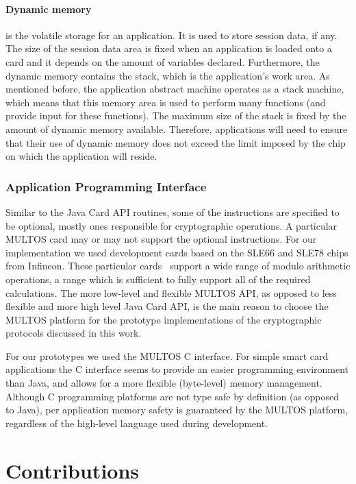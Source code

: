 \paragraph{Dynamic memory} is the volatile storage for an application. It is
used to store session data, if any. The size of the session data area is fixed
when an application is loaded onto a card and it depends on the amount of
variables declared. Furthermore, the dynamic memory contains the stack, which
is the application's work area. As mentioned before, the application abstract
machine operates as a stack machine, which means that this memory area is used
to perform many functions (and provide input for these functions). The maximum
size of the stack is fixed by the amount of dynamic memory available. Therefore,
applications will need to ensure that their use of dynamic memory does not
exceed the limit imposed by the chip~\cite{MIR2012} on which the application
will reside.

\subsubsection{Application Programming Interface}

Similar to the Java Card API routines, some of the instructions are specified to
be optional, mostly ones responsible for cryptographic operations. A particular
MULTOS card may or may not support the optional instructions. For our
implementation we used development cards based on the SLE66 and SLE78 chips from
Infineon. These particular cards~\cite{MULTOS_Implementation2010} support a wide
range of modulo arithmetic operations, a range which is sufficient to fully
support all of the required calculations. The more low-level and flexible MULTOS
API, as opposed to less flexible and more high level Java Card API, is the main
reason to choose the MULTOS platform for the prototype implementations of the
cryptographic protocols discussed in this work.

For our prototypes we used the MULTOS C interface. For simple smart card
applications the C interface seems to provide an easier programming environment
than Java, and allows for a more flexible (byte-level) memory management.
Although C programming platforms are not type safe by definition (as opposed to
Java), per application memory safety is guaranteed by the MULTOS platform,
regardless of the high-level language used during development.

\section{Contributions}

